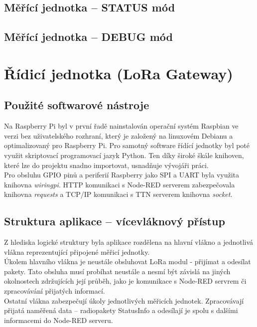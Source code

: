     
\subsection{Měřící jednotka – STATUS mód}
\subsection{Měřící jednotka – DEBUG mód}

   
 
\section{Řídicí jednotka (LoRa Gateway)}
\subsection{Použité softwarové nástroje}
    Na Raspberry Pi byl v první řadě nainstalován operační systém Raspbian \cite{cite:3} ve verzi bez uživatelského rozhraní, který je založený na linuxovém Debianu a optimalizovaný pro Raspberry Pi. Pro samotný software řídící jednotky byl poté využit skriptovací programovací jazyk Python. Ten díky široké škále knihoven, které lze do projektu snadno importovat, usnadňuje vývojáři práci.\\
    Pro obsluhu GPIO pinů a periferií Raspberry jako SPI a UART byla využita knihovna \textit{wiringpi}.
    HTTP komunikaci s Node-RED serverem zabezpečovala knihovna \textit{requests} a TCP/IP komunikaci s TTN serverem knihovna \textit{socket}.
  
\subsection{Struktura aplikace – vícevláknový přístup}
    Z hlediska logické struktury byla aplikace rozdělena na hlavní vlákno a jednotlivá vlákna reprezentující připojené měřicí jednotky.\\
    Úkolem hlavního vlákna je neustále obsluhovat LoRa modul - přijímat a odesílat pakety. Tato obsluha musí probíhat neustále a nesmí být závislá na jiných okolnostech zdržujících její průběh, jako je komunikace s Node-RED servrem či zpracovávání přijatých informací.\\
    Ostatní vlákna zabezpečují úkoly jednotlivých měřicích jednotek. Zpracovávají přijatá naměřená data – radiopakety StatusInfo a odesílají je spolu s dalšími informacemi do Node-RED serveru.
   
